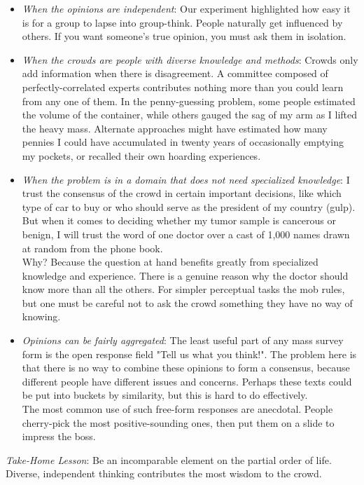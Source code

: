 \documentclass[10pt]{article}
\begin{document}
\begin{itemize}
  \item \textit{When the opinions are independent}: Our experiment highlighted how easy it is for a group to lapse into group-think. People naturally get influenced by others. If you want someone's true opinion, you must ask them in isolation.
  \item \textit{When the crowds are people with diverse knowledge and methods}: Crowds only add information when there is disagreement. A committee composed of perfectly-correlated experts contributes nothing more than you could learn from any one of them. In the penny-guessing problem, some people estimated the volume of the container, while others gauged the sag of my arm as I lifted the heavy mass. Alternate approaches might have estimated how many pennies I could have accumulated in twenty years of occasionally emptying my pockets, or recalled their own hoarding experiences.
  \item \textit{When the problem is in a domain that does not need specialized knowledge}: I trust the consensus of the crowd in certain important decisions, like which type of car to buy or who should serve as the president of my country (gulp). But when it comes to deciding whether my tumor sample is cancerous or benign, I will trust the word of one doctor over a cast of 1,000 names drawn at random from the phone book.\\
Why? Because the question at hand benefits greatly from specialized knowledge and experience. There is a genuine reason why the doctor should know more than all the others. For simpler perceptual tasks the mob rules, but one must be careful not to ask the crowd something they have no way of knowing.
  \item \textit{Opinions can be fairly aggregated}: The least useful part of any mass survey form is the open response field "Tell us what you think!". The problem here is that there is no way to combine these opinions to form a consensus, because different people have different issues and concerns. Perhaps these texts could be put into buckets by similarity, but this is hard to do effectively.\\
The most common use of such free-form responses are anecdotal. People cherry-pick the most positive-sounding ones, then put them on a slide to impress the boss.
\end{itemize}

\textit{Take-Home Lesson}: Be an incomparable element on the partial order of life. Diverse, independent thinking contributes the most wisdom to the crowd.
\end{document}
